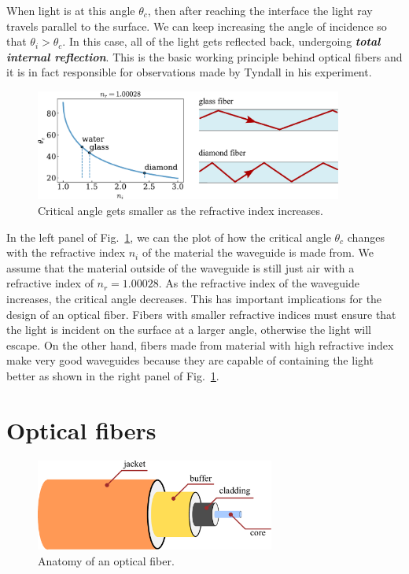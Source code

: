 When light is at this angle $\theta_c$, then after reaching the interface the light ray travels parallel to the surface.
We can keep increasing the angle of incidence so that $\theta_i > \theta_c$.
In this case, all of the light gets reflected back, undergoing \textit{\textbf{total internal reflection}}.
This is the basic working principle behind optical fibers and it is in fact responsible for observations made by Tyndall in his experiment.

\begin{figure}
    \centering
    \includegraphics[width=0.9\textwidth]{lesson7/7-3_crit_angle.pdf}
    \caption[Critical angle]{Critical angle gets smaller as the refractive index increases.}
    \label{fig:7-3_crit_angle}
\end{figure}

In the left panel of Fig.~\ref{fig:7-3_crit_angle}, we can the plot of how the critical angle $\theta_c$ changes with the refractive index $n_i$ of the material the waveguide is made from.
We assume that the material outside of the waveguide is still just air with a refractive index of $n_r = 1.00028$.
As the refractive index of the waveguide increases, the critical angle decreases.
This has important implications for the design of an optical fiber.
Fibers with smaller refractive indices must ensure that the light is incident on the surface at a larger angle, otherwise the light will escape.
On the other hand, fibers made from material with high refractive index make very good waveguides because they are capable of containing the light better as shown in the right panel of Fig.~\ref{fig:7-3_crit_angle}.



\section{Optical fibers}
\label{sec:7-4_optical fibers}

\begin{figure}[t]
    \centering
    \includegraphics[width=0.7\textwidth]{lesson7/7-4_fiber.pdf}
    \caption[Anatomy of an optical fiber]{Anatomy of an optical fiber.}
    \label{fig:7-4_fiber}
\end{figure}


